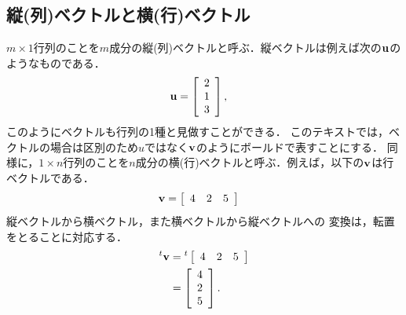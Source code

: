 \subsection{縦(列)ベクトルと横(行)ベクトル\label{sec:row-column_vector}}
%
$m\times 1$行列のことを$m$成分の縦(列)ベクトルと呼ぶ．縦ベクトルは例えば次の${\bf u}$のようなものである．
\begin{align}
 {\bf u} & =\left[\begin{array}{c}
2\\
1\\
3
\end{array}\right], 
\end{align}
このようにベクトルも行列の1種と見做すことができる．
このテキストでは，ベクトルの場合は区別のため$\hat{u}$ではなく${\bf v}$のようにボールドで表すことにする．
%
同様に，$1\times n$行列のことを$n$成分の横(行)ベクトルと呼ぶ．例えば，以下の${\bf v}$は行ベクトルである．
\begin{align}
{\bf v} & =\left[\begin{array}{ccc}
4 & 2 & 5\end{array}\right]  
\end{align}
縦ベクトルから横ベクトル，また横ベクトルから縦ベクトルへの
変換は，転置をとることに対応する．
\begin{align}
 ^{t}{\bf v} & = {}^{t}\left[\begin{array}{ccc}
4 & 2 & 5\end{array}\right]\notag\\
 & =\left[\begin{array}{c}
4\\
2\\
5
\end{array}\right]. 
\end{align}
%

